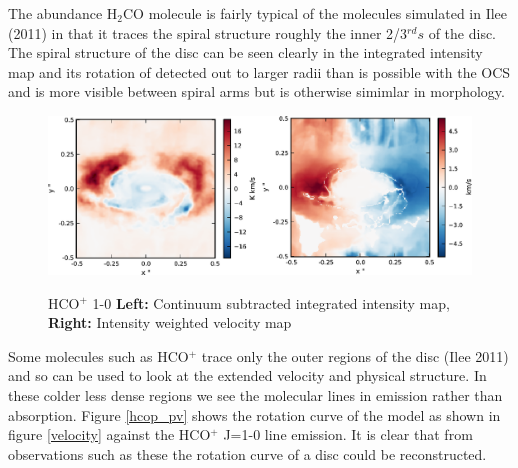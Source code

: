 \documentclass[useAMS,usenatbib]{mn2e}
\begin{document}

The abundance H$_2$CO molecule is fairly typical of the molecules simulated in Ilee (2011) in that it traces the spiral structure roughly the inner 2/3$^{rd}s$ of the disc. The spiral structure of the disc can be seen clearly in the integrated intensity map and its rotation of detected out to larger radii than is possible with the OCS and is more visible between spiral arms but is otherwise simimlar in morphology.

\begin{figure}
 \includegraphics[width=168mm]{Figures/sim/imageHCOp_1-0_30deg_composite_all.eps}
 \label{hco+_all}
 \caption{HCO$^+$ 1-0 {\bf Left:} Continuum subtracted integrated intensity map, {\bf Right:} Intensity weighted velocity map}
\end{figure}



Some molecules such as HCO$^+$ trace only the outer regions of the disc (Ilee 2011) and so can be used to look at the extended velocity and physical structure. In these colder less dense regions we see the molecular lines in emission rather than absorption. Figure \ref{hcop_pv} shows the rotation curve of the model as shown in figure \ref{velocity} against the HCO$^+$ J=1-0 line emission. It is clear that from observations such as these the rotation curve of a disc could be reconstructed.\newline
\end{document}
